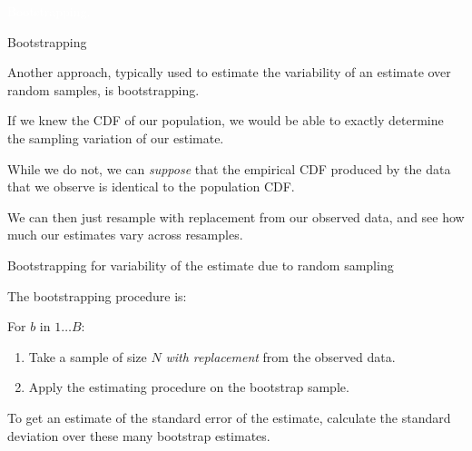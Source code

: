 \documentclass[xcolor={table}, handout]{beamer}
\begin{document}
\begin{transitionframe}
\centering

\LARGE \textcolor{white}{Bootstrapping.}

\end{transitionframe}

\begin{frame}{Bootstrapping}


\begin{wideitemize}
\item Another approach, typically used to estimate the variability of an estimate over random samples, is bootstrapping.
\pause

\item If we knew the CDF of our population, we would be able to exactly determine the sampling variation of our estimate.
\pause

\item While we do not, we can  \textit{suppose} that the empirical CDF produced by the data that we observe is identical to the population CDF.
\pause

\item We can then just resample with replacement from our observed data, and see how much our estimates vary across resamples.
\end{wideitemize}

\end{frame}





\begin{frame}{Bootstrapping for variability of the estimate due to random sampling}


The bootstrapping procedure is:

\begin{wideitemize}
\item For $b$ in $1\dots B$:
\begin{enumerate}

    \item Take a sample of size $N$  \textit{with replacement} from the observed data.\pause

    \item Apply the estimating procedure on the bootstrap sample.%
    \end{enumerate}
\pause

\item To get an estimate of the standard error of the estimate, calculate the standard deviation over these many bootstrap estimates.
\end{wideitemize}

\end{frame}
\end{document}
